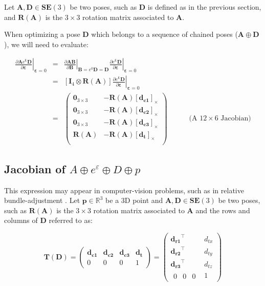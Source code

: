 \documentclass[a4paper,11pt]{report}
\newcommand{\E}{{\bm{\varepsilon}}}
\newcommand{\A}{{\mathbf{A}}}
\newcommand{\B}{{\mathbf{B}}}
\newcommand{\D}{{\mathbf{D}}}
\newcommand{\I}{{\mathbf{I}}}
\begin{document}
Let $\A,\D \in \mathbf{SE}(3)$ be two poses, such as 
$\D$ is defined as in the previous section, and $\mathbf{R}(\A)$ is 
the $3\times 3$ rotation matrix associated to $\A$.

When optimizing a pose $\D$ which belongs to a sequence of chained poses 
($\A \oplus \D$), we will need to evaluate:

\begin{eqnarray}
\left. \frac{\partial \A e^\E \D}{\partial \E} \right|_{\E = 0}
&=& 
\left. \frac{\partial \A \B}{\partial \B} \right|_{\B= e^0 \D = \D}
\left. \frac{\partial e^\E \mathbf{D}}{\partial \E} \right|_{\E = 0}
\\
&=&
\left[ \I_4 \otimes \mathbf{R}(\A) \right]
\left. \frac{\partial e^\E \mathbf{D}}{\partial \E} \right|_{\E = 0}
\\
&=&
\left(
\begin{array}{cc}
 \mathbf{0}_{3\times 3}  & -\mathbf{R}(\A) [\mathbf{d_{c1}}]_\times \\
 \mathbf{0}_{3\times 3}  & -\mathbf{R}(\A) [\mathbf{d_{c2}}]_\times \\
 \mathbf{0}_{3\times 3}  & -\mathbf{R}(\A) [\mathbf{d_{c3}}]_\times \\
 \mathbf{R}(\A)          & -\mathbf{R}(\A) [\mathbf{d_{t}}]_\times \\
\end{array}
\right)
\quad\quad\quad \text{(A $12 \times 6$ Jacobian)}
\end{eqnarray}


\subsection{Jacobian of $A \oplus e^\varepsilon \oplus D \oplus p$}
\label{eq:jacob_A_e_D_p}

This expression may appear in computer-vision problems, 
such as in relative bundle-adjustment \cite{sibley2009rba}.
Let $\mathbf{p} \in \mathbb{R}^3$ be a 3D point
and $\A,\D \in \mathbf{SE}(3)$ be two poses, such as 
$\mathbf{R}(\A)$ is the $3\times 3$ rotation matrix associated to $\A$ and 
the rows and columns of $\D$ referred to as:

\begin{equation}
\mathbf{T}(\mathbf{D}) = 
\left(
\begin{array}{ccc|c}
 \mathbf{d_{c1}}  & \mathbf{d_{c2}}  & \mathbf{d_{c3}}  & \mathbf{d_{t}}  \\
\hline
  0 & 0 & 0 & 1
\end{array}
\right) 
=
\left(
\begin{array}{c|c}
    \mathbf{d_{r1}}^\top  & d_{tx}  \\ 
    \mathbf{d_{r2}}^\top  & d_{ty} \\ 
    \mathbf{d_{r3}}^\top  & d_{tz} \\
\hline
  \begin{array}{ccc}
    0  & 0  & 0 
  \end{array}
    & 1
\end{array}
\right) 
\end{equation}
\end{document}
